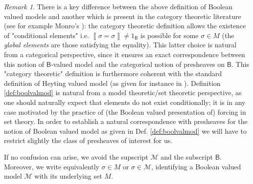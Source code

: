 \documentclass[11pt]{amsart}
\theoremstyle{plain}
\theoremstyle{definition}
\theoremstyle{plain}
\theoremstyle{remark}
\newtheorem{remark}[theorem]{Remark}
\newcommand{\M}{\mathcal{M}}
\newcommand{\bool}[1]{\mathsf{#1}}
\newcommand{\Qp}[1]{\left\llbracket #1 \right\rrbracket}
\newcommand{\0}{\mathsf{0}}
\renewcommand{\1}{\mathsf{1}}
\renewcommand{\2}{\mathsf{2}}
\theoremstyle{definition}
\begin{document}
\begin{remark}
\label{rem:transeq}
There is a key difference between the above definition of Boolean valued models and another which is present in the category theoretic literature (see for example Monro's  \cite{MONRO86}): the category theoretic definition allows the existence of "conditional elements"  i.e. $\Qp{\sigma=\sigma}\neq 1_\bool{B}$ is possible for 
some $\sigma\in M$ (the \emph{global elements} are those satisfying the equality). This latter choice is natural from a categorical perspective, since it ensures an exact correspondence between this notion of $\bool{B}$-valued model and the categorical notion of  presheaves on $\bool{B}$. This "category theoretic" definition is furthermore coherent with the standard definition of Heyting valued model (as given for instance in \cite{FOURSCOTT}). Definition \ref{def:boolvalmod} is natural from a model theoretic/set theoretic perspective, as one should naturally expect that elements do not exist conditionally; it is in any case motivated by the practice of (the Boolean valued presentation of) forcing in set theory. In order to establish a natural correspondence with presheaves for the  notion of Boolean valued model as given in Def. \ref{def:boolvalmod} we will have to restrict slightly the class of presheaves of interest for us. 
\end{remark}
If no confusion can arise, we avoid the supscript $\M$ and the subscript $\bool{B}$. Moreover, we write equivalently $\sigma\in M$ or $\sigma\in\M$, identifying a Boolean valued model $\M$ with its underlying set $M$.
\end{document}
